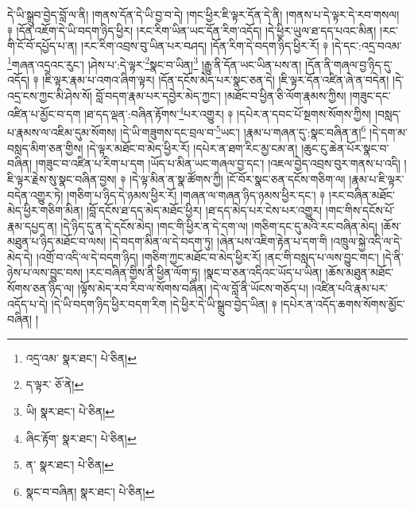དེ་ཡི་སྒྲུབ་བྱེད་བློ་ལ་ནི། །གནས་དོན་དེ་ཡི་བྱ་བ་དེ། །གང་ཕྱིར་ཇི་ལྟར་དོན་དེ་ནི། །གནས་པ་དེ་ལྟར་དེ་རབ་གསལ། ༈ །དོན་འཇོག་དེ་ཡི་བདག་ཉིད་ཕྱིར། །རང་རིག་ཡིན་ཡང་དོན་རིག་འདོད། །དེ་ཕྱིར་ཡུལ་ཐ་དད་པའང་མིན། །རང་གི་ངོ་བོ་དཔྱོད་པ་ན། །རང་རིག་འབྲས་བུ་ཡིན་པར་བཤད། །དོན་རིག་དེ་བདག་ཉིད་ཕྱིར་རོ། ༈ །དེ་དང་:འདྲ་བའམ་\footnote{འདྲ་འམ་  སྣར་ཐང་།  པེ་ཅིན། }གཞན་འདྲའང་རུང་། །ཤེས་པ་:དེ་ལྟར་\footnote{ད་ལྟར་  ཅོ་ནེ། }སྣང་བ་ཡིན།\footnote{ཡི།  སྣར་ཐང་།  པེ་ཅིན། } །རྒྱུ་ནི་དོན་ཡང་ཡིན་པས་ན། །དོན་ནི་གཞལ་བྱ་ཉིད་དུ་འདོད། ༈ །ཇི་ལྟར་རྣམ་པ་འགའ་ཞིག་ལྟར། །དོན་དངོས་མེད་པར་སྣང་ཅན་དེ། །ཇི་ལྟར་དོན་འཛིན་ཞེ་ན་བདེན། །དེ་འདྲ་ངས་ཀྱང་མི་ཤེས་སོ། བློ་བདག་རྣམ་པར་དབྱེར་མེད་ཀྱང་། །མཐོང་བ་ཕྱིན་ཅི་ལོག་རྣམས་ཀྱིས། །གཟུང་དང་འཛིན་པ་མྱོང་བ་དག །ཐ་དད་ལྡན་:བཞིན་རྟོགས་\footnote{ཞིང་རྟོག་  སྣར་ཐང་།  པེ་ཅིན། }པར་འགྱུར། ༈ །དཔེར་ན་དབང་པོ་སྔགས་སོགས་ཀྱིས། །བསླད་པ་རྣམས་ལ་འཇིམ་དུམ་སོགས། །དེ་ཡི་གཟུགས་དང་བྲལ་བ་\footnote{ན་  སྣར་ཐང་།  པེ་ཅིན། }ཡང་། །རྣམ་པ་གཞན་དུ་:སྣང་བཞིན་ན།\footnote{སྣང་བ་བཞིན།  སྣར་ཐང་།  པེ་ཅིན། } །དེ་དག་མ་བསླད་མིག་ཅན་གྱིས། །དེ་ལྟར་མཐོང་བ་མེད་ཕྱིར་རོ། །དཔེར་ན་ཐག་རིང་མྱ་ངམ་ན། །ཆུང་ངུ་ཆེན་པོར་སྣང་བ་བཞིན། །གཟུང་བ་འཛིན་པ་རིག་པ་དག །ཡོད་པ་མིན་ཡང་གཞལ་བྱ་དང་། །འཇལ་བྱེད་འབྲས་བུར་གནས་པ་འདི། །ཇི་ལྟར་རྗེས་སུ་སྣང་བཞིན་བྱས། ༈ །དེ་ལྟ་མིན་ན་སྣ་ཚོགས་ཀྱི། །ངོ་བོར་སྣང་ཅན་དངོས་གཅིག་ལ། །རྣམ་པ་ཇི་ལྟར་བདེན་འགྱུར་ཏེ། །གཅིག་པ་ཉིད་དེ་ཉམས་ཕྱིར་རོ། །གཞན་ལ་གཞན་ཉིད་ཉམས་ཕྱིར་དང་། ༈ །རང་བཞིན་མཐོང་མེད་ཕྱིར་གཅིག་མིན། །བློ་དངོས་ཐ་དད་མེད་མཐོང་ཕྱིར། །ཐ་དད་མེད་པར་ངེས་པར་འགྱུར། །གང་གིས་དངོས་པོ་རྣམ་དཔྱད་ན། །དེ་ཉིད་དུ་ན་དེ་དངོས་མེད། །གང་གི་ཕྱིར་ན་དེ་དག་ལ། །གཅིག་དང་དུ་མའི་རང་བཞིན་མེད། །ཆོས་མཐུན་པ་ཉིད་མཐོང་བ་ལས། །དེ་བདག་མིན་ལ་དེ་བདག་ཏུ། །ཞེན་པས་འཇིག་རྟེན་པ་དག་གི །འཁྲུལ་སྐྱེ་འདི་ལ་དེ་མེད་དེ། །འགྲོ་བ་འདི་ལ་དེ་བདག་ཉིད། །གཅིག་ཀྱང་མཐོང་བ་མེད་ཕྱིར་རོ། །ནང་གི་བསླད་པ་ལས་བྱུང་གང་། །དེ་ནི་ཉེས་པ་ལས་བྱུང་བས། །རང་བཞིན་གྱིས་ནི་ཕྱིན་ལོག་ཏུ། །སྣང་བ་ཅན་འདིའང་ཡོད་པ་ཡིན། །ཆོས་མཐུན་མཐོང་སོགས་ཅན་ཉིད་ལ། །ལྟོས་མེད་རབ་རིབ་ལ་སོགས་བཞིན། །དེ་ལ་བློ་ནི་ཡོངས་གཅོད་པ། །འཛིན་པའི་རྣམ་པར་འདོད་པ་དེ། །དེ་ཡི་བདག་ཉིད་ཕྱིར་བདག་རིག །དེ་ཕྱིར་དེ་ཡི་སྒྲུབ་བྱེད་ཡིན། ༈ །དཔེར་ན་འདོད་ཆགས་སོགས་མྱོང་བཞིན། །
